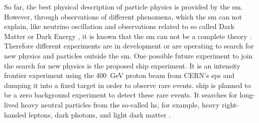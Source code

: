 So far, the best physical description of particle physics is provided by the \ac{sm}.
However, through observations of different phenomena, which the \ac{sm} can not explain, like neutrino oscillation \cite{Fukuda_1998,Troitsky_2012} and observations related to so called Dark Matter or Dark Energy \cite{Troitsky_2012}, it is known that the \ac{sm} can not be a complete theory \cite{}.
Therefore different experiments are in development or are operating to search for new physics and particles outside the \ac{sm}.
One possible future experiment to join the search for new physics is the proposed \ac{ship} experiment.
It is an intensity frontier experiment using the \SI{400}{\giga\electronvolt} proton beam from CERN's \ac{sps} and dumping it into a fixed target in order to observe rare events.
\ac{ship} is planned to be a zero background experiment to detect these rare events.
It searches for long-lived heavy neutral particles from the so-called \ac{hs}, for example, heavy right-handed leptons, dark photons, and light dark matter \cite{instrumentation}.

